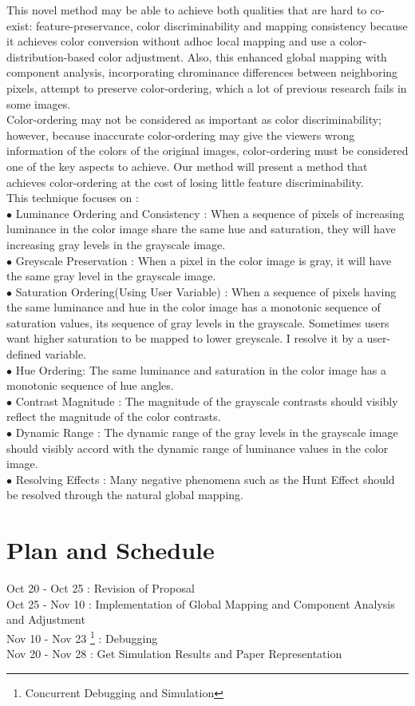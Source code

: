 \documentclass{article}
\begin{document}
 This novel method may be able to achieve both qualities that are hard to co-exist: feature-preservance, color discriminability and mapping consistency because it achieves color conversion without adhoc local mapping and use a color-distribution-based color adjustment. Also, this enhanced global mapping with component analysis,  incorporating chrominance differences between neighboring pixels, attempt to preserve color-ordering, which a lot of previous research fails in some images.\\
Color-ordering may not be considered as important as color discriminability; however, because inaccurate color-ordering may give the viewers wrong information of the colors of the original images, color-ordering must be considered one of the key aspects to achieve. Our method will present a method that achieves color-ordering at the cost of losing little feature discriminability.\\
This technique focuses on :\\
$\bullet$ Luminance Ordering and Consistency : When a sequence of pixels of increasing luminance in the color image share the same hue and saturation, they will have increasing gray levels in the grayscale image.\\
$\bullet$ Greyscale Preservation : When a pixel in the color image is gray, it will have the same gray level in the grayscale image.\\
$\bullet$ Saturation Ordering(Using User Variable) : When a sequence of pixels having the same luminance and hue in the color image has a monotonic sequence of saturation values, its sequence of gray levels in the grayscale. Sometimes users want higher saturation to be mapped to lower greyscale. I resolve it by a user-defined variable.\\
$\bullet$ Hue Ordering: The same luminance and saturation in the color image has a monotonic sequence of hue angles.\\
$\bullet$ Contrast Magnitude : The magnitude of the grayscale contrasts should visibly reflect the magnitude of the color contrasts.\\
$\bullet$ Dynamic Range : The dynamic range of the gray levels in the grayscale image should visibly accord with the dynamic range of luminance values in the color image.\\
$\bullet$ Resolving Effects : Many negative phenomena such as the Hunt Effect should be resolved through the natural global mapping.\\


\section{Plan and Schedule}
Oct 20 - Oct 25 : Revision of Proposal\\
Oct 25 - Nov 10 : Implementation of Global Mapping and Component Analysis and Adjustment\\
Nov 10 - Nov 23 \footnote{Concurrent Debugging and Simulation} : Debugging\\
Nov 20 - Nov 28 : Get Simulation Results and Paper Representation\\
\end{document}
